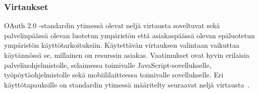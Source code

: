 \documentclass[finnish,gradu]{tktltiki}
\begin{document}


  \subsubsection{Virtaukset} %
  \label{ssub:oauth_virtaukset}

  OAuth 2.0 -standardin ytimessä olevat neljä virtausta soveltuvat sekä palvelinpäässä olevan luotetun ympäristön että asiakaspäässä olevan epäluotetun ympäristön käyttötarkoituksiin. Käytettävän virtauksen valintaan vaikuttaa käytännössä se, millainen on resurssin asiakas. Vaatimukset ovat hyvin erilaisia palvelinohjelmistolle, selaimessa toimivalle JavaScript-sovellukselle, työpöytäohjelmistolle sekä mobiililaitteessa toimivalle sovellukselle. Eri käyttötapauksille on standardin ytimessä määritelty seuraavat neljä virtausta~\cite{ietf_oauth2}.

\end{document}
